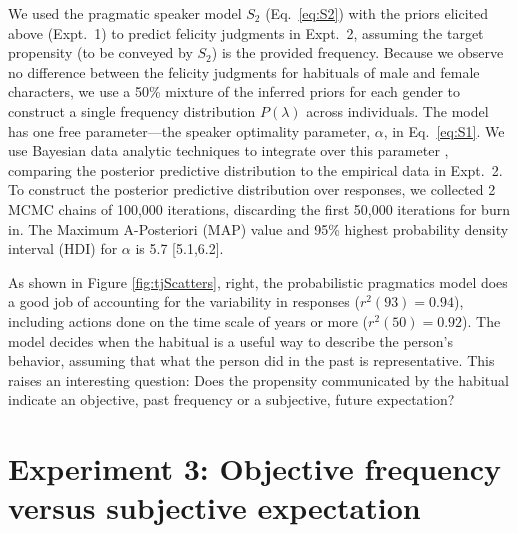 \documentclass[10pt,letterpaper]{article}
\begin{document}
We used the pragmatic speaker model $S_2$ (Eq.~\ref{eq:S2}) with the priors elicited above (Expt.~1) to predict felicity judgments in Expt.~2, assuming the target propensity (to be conveyed by $S_2$) is the provided frequency.
Because we observe no difference between the felicity judgments for habituals of male and female characters, we use a 50\% mixture of the inferred priors for each gender to construct a single frequency distribution $P(\lambda)$ across individuals.
The model has one free parameter---the speaker optimality parameter, $\alpha$, in Eq.~\ref{eq:S1}. 
We use Bayesian data analytic techniques to integrate over this parameter \cite{LW2014}, comparing the posterior predictive distribution to the empirical data in Expt.~2.
To construct the posterior predictive distribution over responses, we collected 2 MCMC chains of 100,000 iterations, discarding the first 50,000 iterations for burn in.
The Maximum A-Posteriori (MAP) value and 95\% highest probability density interval (HDI) for $\alpha$ is 5.7 [5.1,6.2].

As shown in Figure \ref{fig:tjScatters}, right, the probabilistic pragmatics model does a good job of accounting for the variability in responses ($r^2(93) = 0.94$), including actions done on the time scale of years or more  ($r^2(50) = 0.92$).
The model decides when the habitual is a useful way to describe the person's behavior, assuming that what the person did in the past is representative. 
This raises an interesting question: Does the propensity communicated by the habitual indicate an objective, past frequency or a subjective, future expectation?


\section{Experiment 3: Objective frequency versus subjective expectation}
\end{document}
